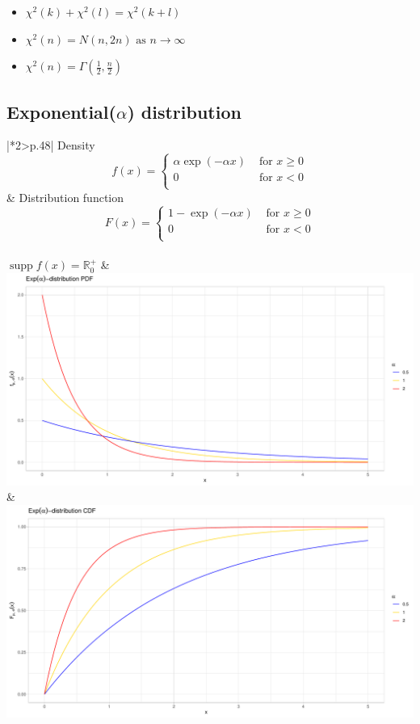 \documentclass{article}
\DeclareMathOperator\supp{supp}
\begin{document}
	\begin{itemize}
		\item $\chi^{2}\left( k\right) + \chi^{2}\left( l\right) = \chi^{2}\left( k+l\right)$
		\item $\chi^{2}\left( n\right) = N\left( n,2n\right) \text{ as } n \rightarrow \infty $
		\item $\chi^{2}\left( n\right) = \Gamma\left( \frac{1}{2},\frac{n}{2}\right)$
	\end{itemize}
	
	\newpage
	
	\subsection{Exponential($\alpha$) distribution}
	\begin{tabular}{|*2{>{\centering\arraybackslash}p{}|}}
		\hline
		Density
		\[ f \left ( x \right ) = \left\{\begin{matrix} 
			\alpha\exp\left( - \alpha x\right)  & \text{ for } x\geq0\\ 
			0 & \text{ for } x<0\\
		\end{matrix}\right. 
		\] 
		& Distribution function
		\[ F \left ( x \right ) = \left\{\begin{matrix} 
			1-\exp\left( - \alpha x\right)  & \text{ for } x\geq0\\ 
			0 & \text{ for } x<0\\
		\end{matrix}\right. \]
		\\
		$\supp f\left( x\right) = \mathbb{R}^{+}_{0}$ &
		\\
		\includegraphics[width=1.0\linewidth]{material/exponential_PDF}
		\label{fig:exponential_PDF}
		&
		\includegraphics[width=1.0\linewidth]{material/exponential_CDF}

\end{tabular}
\end{document}
